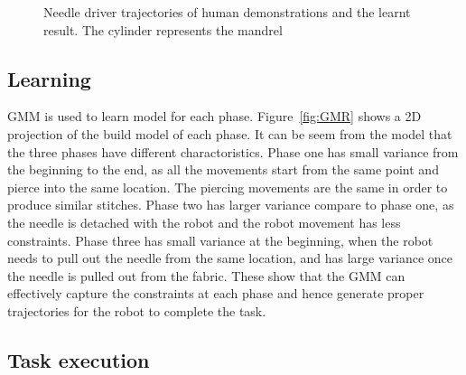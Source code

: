 \begin{figure}
{\caption{\scriptsize{Needle driver trajectories of human demonstrations and the learnt result. The cylinder represents the mandrel}}
\label{fig:demo}
}\end{figure}

\subsection{Learning}
GMM is used to learn model for each phase. Figure~\ref{fig:GMR} shows a 2D projection of the build model of each phase. It can be seem from the model that the three phases have different charactoristics. Phase one has small variance from the beginning to the end, as all the movements start from the same point and pierce into the same location. The piercing movements are the same in order to produce similar stitches. Phase two has larger variance compare to phase one, as the needle is detached with the robot and the robot movement has less constraints. Phase three has small variance at the beginning, when the robot needs to pull out the needle from the same location, and has large variance once the needle is pulled out from the fabric. These show that the GMM can effectively capture the constraints at each phase and hence generate proper trajectories for the robot to complete the task.

\begin{figure}
\end{figure}


\subsection{Task execution}
